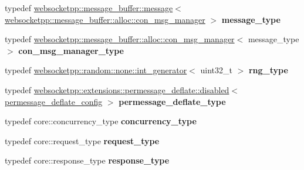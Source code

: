 \begin{DoxyCompactItemize}
\mbox{\label{structstub__config_a251ee9935f06ff126dbdcae6af183493}} 
typedef \mbox{\hyperlink{classwebsocketpp_1_1message__buffer_1_1message}{websocketpp\+::message\+\_\+buffer\+::message}}$<$ \mbox{\hyperlink{classwebsocketpp_1_1message__buffer_1_1alloc_1_1con__msg__manager}{websocketpp\+::message\+\_\+buffer\+::alloc\+::con\+\_\+msg\+\_\+manager}} $>$ {\bfseries message\+\_\+type}
\item 
\mbox{\label{structstub__config_a590413e515623cd51f1cd6c0f72f1018}} 
typedef \mbox{\hyperlink{classwebsocketpp_1_1message__buffer_1_1alloc_1_1con__msg__manager}{websocketpp\+::message\+\_\+buffer\+::alloc\+::con\+\_\+msg\+\_\+manager}}$<$ message\+\_\+type $>$ {\bfseries con\+\_\+msg\+\_\+manager\+\_\+type}
\item 
\mbox{\label{structstub__config_aeea6c7fab96f8cc229d78a822ff9cc5d}} 
typedef \mbox{\hyperlink{classwebsocketpp_1_1random_1_1none_1_1int__generator}{websocketpp\+::random\+::none\+::int\+\_\+generator}}$<$ uint32\+\_\+t $>$ {\bfseries rng\+\_\+type}
\item 
\mbox{\label{structstub__config_a542a8c30b8eec0e129d9487b3a598bdb}} 
typedef \mbox{\hyperlink{classwebsocketpp_1_1extensions_1_1permessage__deflate_1_1disabled}{websocketpp\+::extensions\+::permessage\+\_\+deflate\+::disabled}}$<$ \mbox{\hyperlink{structstub__config_1_1permessage__deflate__config}{permessage\+\_\+deflate\+\_\+config}} $>$ {\bfseries permessage\+\_\+deflate\+\_\+type}
\item 
\mbox{\label{structstub__config_adfbabf7bc98d14349e3aaf93ce286679}} 
typedef core\+::concurrency\+\_\+type {\bfseries concurrency\+\_\+type}
\item 
\mbox{\label{structstub__config_adf25cb289c00f17e0edde3ee14c7d513}} 
typedef core\+::request\+\_\+type {\bfseries request\+\_\+type}
\item 
\mbox{\label{structstub__config_af5bf09e5641cb374d09ca1cc57a3db68}} 
typedef core\+::response\+\_\+type {\bfseries response\+\_\+type}
\item 
\mbox{\label{structstub__config_a608dd8f08c2967a1279f862646d5ccfe}} 

\end{DoxyCompactItemize}
